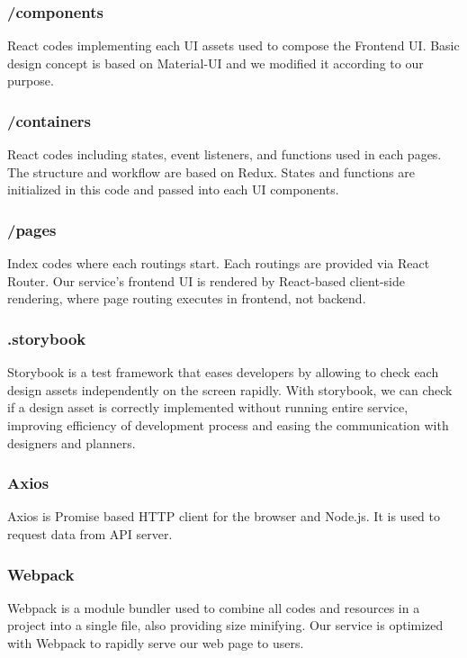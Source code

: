 \documentclass[conference,compsoc]{IEEEtran}
\begin{document}
\subsubsection{/components}
React codes implementing each UI assets used to compose the Frontend UI. Basic design concept is based on Material-UI and we modified it according to our purpose.

\subsubsection{/containers}
React codes including states, event listeners, and functions used in each pages. The structure and workflow are based on Redux. States and functions are initialized in this code and passed into each UI components.

\subsubsection{/pages}
Index codes where each routings start. Each routings are provided via React Router. Our service's frontend UI is rendered by React-based client-side rendering, where page routing executes in frontend, not backend.

\subsubsection{.storybook}
Storybook is a test framework that eases developers by allowing to check each design assets independently on the screen rapidly. With storybook, we can check if a design asset is correctly implemented without running entire service, improving efficiency of development process and easing the communication with designers and planners.

\subsubsection{Axios}
Axios is Promise based HTTP client for the browser and Node.js. It is used to request data from API server.

\subsubsection{Webpack}
Webpack is a module bundler used to combine all codes and resources in a project into a single file, also providing size minifying. Our service is optimized with Webpack to rapidly serve our web page to users.
\end{document}
